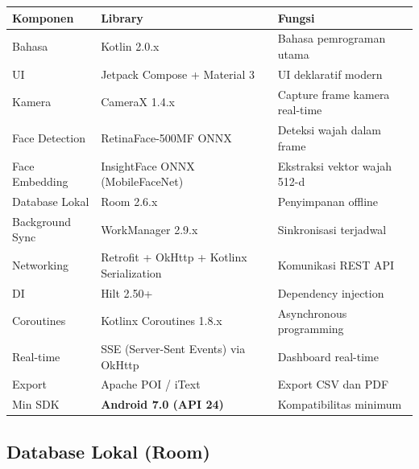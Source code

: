 \documentclass[12pt,a4paper]{article}
\begin{document}
\begin{table}[H]
  \centering
  \begin{tabularx}{\textwidth}{lXl}
    \toprule
    \textbf{Komponen} & \textbf{Library} & \textbf{Fungsi} \\
    \midrule
    Bahasa & Kotlin 2.0.x & Bahasa pemrograman utama \\
    UI & Jetpack Compose + Material 3 & UI deklaratif modern \\
    Kamera & CameraX 1.4.x & Capture frame kamera real-time \\
    Face Detection & RetinaFace-500MF ONNX & Deteksi wajah dalam frame \\
    Face Embedding & InsightFace ONNX (MobileFaceNet) & Ekstraksi vektor wajah 512-d \\
    Database Lokal & Room 2.6.x & Penyimpanan offline \\
    Background Sync & WorkManager 2.9.x & Sinkronisasi terjadwal \\
    Networking & Retrofit + OkHttp + Kotlinx Serialization & Komunikasi REST API \\
    DI & Hilt 2.50+ & Dependency injection \\
    Coroutines & Kotlinx Coroutines 1.8.x & Asynchronous programming \\
    Real-time & SSE (Server-Sent Events) via OkHttp & Dashboard real-time \\
    Export & Apache POI / iText & Export CSV dan PDF \\
    Min SDK & \textbf{Android 7.0 (API 24)} & Kompatibilitas minimum \\
    \bottomrule
  \end{tabularx}
\end{table}

\subsection{Database Lokal (Room)}
\end{document}
